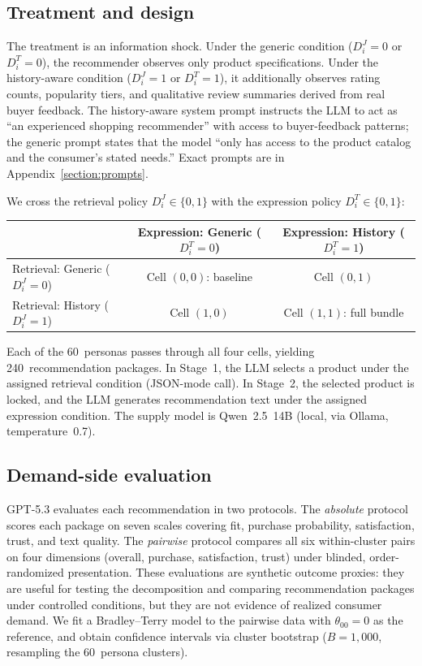 \documentclass[11pt]{article}
\begin{document}
\subsection{Treatment and design}

The treatment is an information shock. Under the generic condition ($D_i^J = 0$ or $D_i^T = 0$), the recommender observes only product specifications. Under the history-aware condition ($D_i^J = 1$ or $D_i^T = 1$), it additionally observes rating counts, popularity tiers, and qualitative review summaries derived from real buyer feedback. The history-aware system prompt instructs the LLM to act as ``an experienced shopping recommender'' with access to buyer-feedback patterns; the generic prompt states that the model ``only has access to the product catalog and the consumer's stated needs.'' Exact prompts are in Appendix~\ref{section:prompts}.

We cross the retrieval policy $D_i^J \in \{0, 1\}$ with the expression policy $D_i^T \in \{0, 1\}$:
\begin{center}
\small
\begin{tabular}{lcc}
\toprule
& Expression: Generic ($D_i^T{=}0$) & Expression: History ($D_i^T{=}1$) \\
\midrule
Retrieval: Generic ($D_i^J{=}0$) & Cell $(0,0)$: baseline & Cell $(0,1)$ \\
Retrieval: History ($D_i^J{=}1$) & Cell $(1,0)$ & Cell $(1,1)$: full bundle \\
\bottomrule
\end{tabular}
\end{center}
Each of the 60~personas passes through all four cells, yielding 240~recommendation packages. In Stage~1, the LLM selects a product under the assigned retrieval condition (JSON-mode call). In Stage~2, the selected product is locked, and the LLM generates recommendation text under the assigned expression condition. The supply model is Qwen~2.5~14B (local, via Ollama, temperature~0.7).

\subsection{Demand-side evaluation}

GPT-5.3 evaluates each recommendation in two protocols. The \emph{absolute} protocol scores each package on seven scales covering fit, purchase probability, satisfaction, trust, and text quality. The \emph{pairwise} protocol compares all six within-cluster pairs on four dimensions (overall, purchase, satisfaction, trust) under blinded, order-randomized presentation. These evaluations are synthetic outcome proxies: they are useful for testing the decomposition and comparing recommendation packages under controlled conditions, but they are not evidence of realized consumer demand. We fit a Bradley--Terry model to the pairwise data with $\theta_{00} = 0$ as the reference, and obtain confidence intervals via cluster bootstrap ($B = 1{,}000$, resampling the 60~persona clusters).
\end{document}
